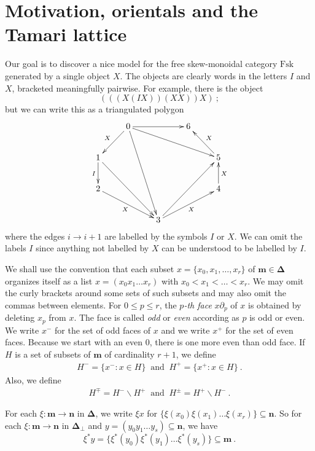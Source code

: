 \documentclass[a4paper,12pt,reqno]{amsart}
\theoremstyle{definition}
\theoremstyle{fact}
\theoremstyle{genquest}
\theoremstyle{step}
\newcommand{\lra}{\longrightarrow}
\def\ordm{{\mathbf{m}}}
\begin{document}
\section{Motivation, orientals and the Tamari lattice}

Our goal is to discover a nice model for the free skew-monoidal category $\mathrm{Fsk}$ generated by a single object $X$. 
The objects are clearly words in the letters $I$ and $X$, bracketed meaningfully pairwise. 
For example, there is the object 
\begin{equation}
(((X(IX))(XX))X) \ ;
\end{equation}
but we can write this as a triangulated polygon
\begin{equation}\label{heptagon1}
\xymatrix{
& 0 \ar[rr]{} \ar[rrrd]{} \ar[rddd]{}  \ar[ld]_{X}  & & 6  &  \\
1 \ar[rrdd]{} \ar[d]_{I} & & & & 5 \ar[lu]_{X} \\
2  \ar[rrd]_{X} & & & & 4  \ar[u]_{X} \\
& &  3 \ar[rruu]{}  \ar[rru]_{X} &
}
\end{equation}
where the edges $i\lra i+1$ are labelled by the symbols $I$ or $X$.
We can omit the labels $I$ since anything not labelled by $X$ can be understood to be labelled by $I$.

We shall use the convention that each subset $x=\{x_0,x_1, \dots ,x_r\}$ of $\mathbf{m}\in \mathbf{\Delta}$ organizes itself as a list 
$x=(x_0x_1\dots x_r)$ with $x_0<x_1< \dots <x_r$. 
We may omit the curly brackets around some sets of such subsets and may also omit the commas between elements. 
For $0\le p \le r$, the {\em $p$-th face} $x\partial_p$ of 
$x$ is obtained by deleting $x_p$ from $x$.
The face is called {\em odd} or {\em even} according as $p$ is odd or even.
We write $x^-$ for the set of odd faces of $x$ and we write $x^+$ for the set of even faces. 
Because we start with an even $0$, there is one more even than odd face.
If $H$ is a set of subsets of $\ordm$ of cardinality $r+1$, we define
\begin{eqnarray}
H^- = \{x^- : x\in H\} \ \text{  and  } \ H^+ = \{x^+ : x\in H\} \ . 
\end{eqnarray}
Also, we define
\begin{eqnarray}
H^{\mp} = H^- \smallsetminus H^+ \ \text{  and  } \ H^{\pm} = H^+ \smallsetminus H^- \ . 
\end{eqnarray}

For each $\xi : \mathbf{m} \lra \mathbf{n}$ in $\mathbf{\Delta}$, we write
$\xi x$ for $\{\xi(x_0)\xi(x_1) \dots \xi(x_r)\} \subseteq \mathbf{n}$. 
So for each $\xi : \mathbf{m} \lra \mathbf{n}$ in $\mathbf{\Delta}_{\bot}$
and $y=(y_0y_1\dots y_s) \subseteq \mathbf{n}$, we have
$$\xi^* y = \{\xi^*(y_0)\xi^*(y_1) \dots \xi^*(y_s)\} \subseteq \mathbf{m} \ .$$ 
\end{document}
